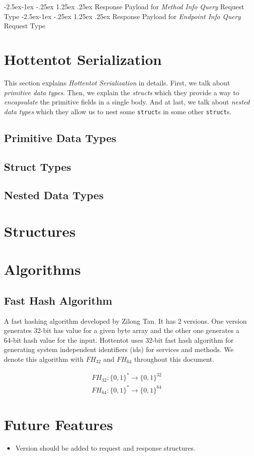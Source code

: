 \documentclass[10pt,a4paper]{article}
\makeatletter
\renewcommand\paragraph{\@startsection{paragraph}{4}{\z@}%
            {-2.5ex\@plus -1ex \@minus -.25ex}%
            {1.25ex \@plus .25ex}%
            {\normalfont\normalsize\bfseries}}
\makeatother
\begin{document}
\paragraph{Response Payload for \textit{Method Info Query} Request Type}
\paragraph{Response Payload for \textit{Endpoint Info Query} Request Type}


\section{Hottentot Serialization}
This section explains \textit{Hottentot Serialization} in details. First, we talk about \textit{primitive data types}. Then, we explain the \textit{structs} which they provide a way to \textit{encapsulate} the primitive fields in a single body. And at last, we talk about \textit{nested data types} which they allow us to nest some \texttt{struct}s in some other \texttt{struct}s.

\subsection{Primitive Data Types}
\subsection{Struct Types}
\subsection{Nested Data Types}

\section{Structures}

\section{Algorithms}

\subsection{Fast Hash Algorithm}
A fast hashing algorithm developed by Zilong Tan. It has 2 versions. One version generates 32-bit has value for a given byte array and the other one generates a 64-bit hash value for the input. Hottentot uses 32-bit fast hash algorithm for generating system independent identifiers (ids) for services and methods. We denote this algorithm with $ FH_{32} $ and $ FH_{64} $ throughout this document.

\begin{equation}
\begin{split}
  FH_{32}: \{0, 1\}^* \to \{0, 1\}^{32}  \\
  FH_{64}: \{0, 1\}^* \to \{0, 1\}^{64}
\end{split}
\end{equation}


\section{Future Features}
\begin{itemize}
  \item Version should be added to request and response structures.
\end{itemize}
\end{document}
